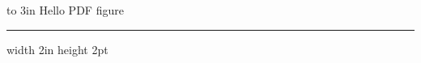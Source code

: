   
\pdfpagewidth=3in \pdfpageheight=1in \hoffset=-1in \voffset=-1in
\nopagenumbers
\hbox to 3in{\hskip 0.2in Hello PDF figure}\vskip 4pt \hrule width 2in height 2pt
\bye
